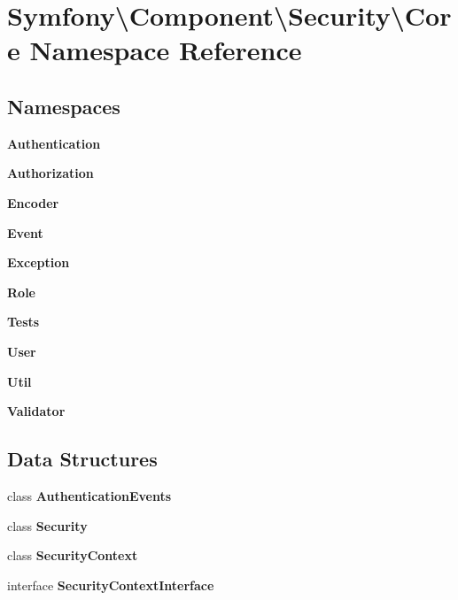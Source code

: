 \section{Symfony\textbackslash{}Component\textbackslash{}Security\textbackslash{}Core Namespace Reference}
\label{namespace_symfony_1_1_component_1_1_security_1_1_core}
\subsection*{Namespaces}
\begin{DoxyCompactItemize}
\item 
 {\bf Authentication}
\item 
 {\bf Authorization}
\item 
 {\bf Encoder}
\item 
 {\bf Event}
\item 
 {\bf Exception}
\item 
 {\bf Role}
\item 
 {\bf Tests}
\item 
 {\bf User}
\item 
 {\bf Util}
\item 
 {\bf Validator}
\end{DoxyCompactItemize}
\subsection*{Data Structures}
\begin{DoxyCompactItemize}
\item 
class {\bf Authentication\+Events}
\item 
class {\bf Security}
\item 
class {\bf Security\+Context}
\item 
interface {\bf Security\+Context\+Interface}
\end{DoxyCompactItemize}
